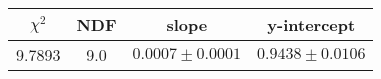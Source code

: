 \begin{tabular}{|c|c|c|c|}

\hline
$\chi^{2}$ & NDF & slope & y-intercept  \\
\hline
9.7893 & 9.0 & $0.0007\pm0.0001$ & $0.9438\pm0.0106$ \\
\hline

\end{tabular}